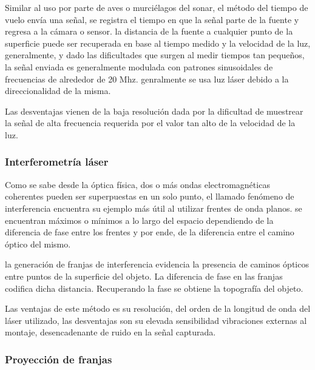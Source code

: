 \documentclass[UTF8]{article}
\begin{document}
Similar al uso por parte de aves o murciélagos del sonar, el método del tiempo de vuelo envía una señal, se registra el tiempo en que la señal parte de la fuente y regresa a la cámara o sensor. la distancia de la fuente a cualquier punto de la superficie puede ser recuperada en base al tiempo medido y la velocidad de la luz, generalmente, y dado las dificultades que surgen al medir tiempos tan pequeños, la señal enviada es generalmente modulada con patrones sinusoidales de frecuencias de alrededor de 20 Mhz. genralmente se usa luz láser debido a la direccionalidad de la misma.
\medskip

Las desventajas vienen de la baja resolución dada por la dificultad de muestrear la señal de alta frecuencia requerida por el valor tan alto de la velocidad de la luz. \medskip




\subsubsection{Interferometría láser}


Como se sabe desde la óptica física, dos o más ondas electromagnéticas coherentes pueden ser superpuestas en un solo punto, el llamado fenómeno de interferencia encuentra su ejemplo más útil al utilizar frentes de onda planos. se encuentran máximos o mínimos a lo largo del espacio dependiendo de la diferencia de fase entre los frentes y por ende, de la diferencia entre el camino óptico del mismo.
\medskip

la generación de franjas de interferencia evidencia la presencia de caminos ópticos entre puntos de la superficie del objeto. La diferencia de fase en las franjas codifica dicha distancia. Recuperando la fase se obtiene la topografía del objeto.
\medskip

Las ventajas de este método es su resolución, del orden de la longitud de onda del láser utilizado, las desventajas son su elevada sensibilidad vibraciones externas al montaje, desencadenante de ruido en la señal capturada.
\medskip
\subsubsection{Proyección de franjas}
\end{document}
